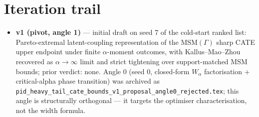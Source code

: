 \documentclass[11pt]{article}
\theoremstyle{definition}
\theoremstyle{plain}
\theoremstyle{remark}
\begin{document}
\section{Iteration trail}

\begin{itemize}[leftmargin=*]
  \item \textbf{v1 (pivot, angle 1)} --- initial draft on seed 7 of the cold-start ranked list: Pareto-extremal latent-coupling representation of the MSM$(\Gamma)$ sharp CATE upper endpoint under finite $\alpha$-moment outcomes, with Kallus--Mao--Zhou recovered as $\alpha \to \infty$ limit and strict tightening over support-matched MSM bounds; prior verdict: none. Angle 0 (seed 0, closed-form $W_\alpha$ factorisation + critical-alpha phase transition) was archived as \texttt{pid\_heavy\_tail\_cate\_bounds\_v1\_proposal\_angle0\_rejected.tex}; this angle is structurally orthogonal --- it targets the optimiser characterisation, not the width formula.
\end{itemize}
\end{document}
